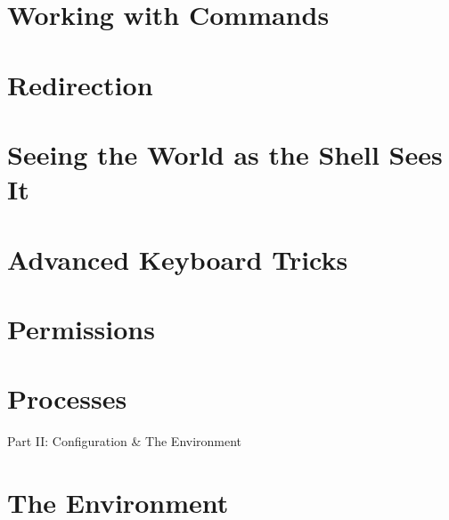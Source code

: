 \documentclass[oneside]{book}
\numberwithin{equation}{section}
\begin{document}

\section{Working with Commands}


\section{Redirection}


\section{Seeing the World as the Shell Sees It}


\section{Advanced Keyboard Tricks}


\section{Permissions}


\section{Processes}


\begin{center}
	\huge Part II: Configuration \& The Environment
\end{center}

\section{The Environment}
\end{document}
